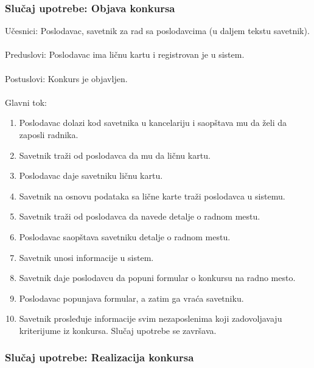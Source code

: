 \subsubsection{Slu\v caj upotrebe: Objava konkursa}
\label{su: razgovor sa poslodavcem}

\noindent Učesnici: Poslodavac, savetnik za rad sa poslodavcima (u daljem tekstu savetnik).
\\
\\ Preduslovi: Poslodavac ima ličnu kartu i registrovan je u sistem.
\\
\\ Postuslovi: Konkurs je objavljen.
\\
\\ Glavni tok:
\begin{enumerate}
\item Poslodavac dolazi kod savetnika u kancelariju i saopštava mu da želi da zaposli radnika.
\item Savetnik traži od poslodavca da mu da ličnu kartu.
\item Poslodavac daje savetniku ličnu kartu.
\item Savetnik na osnovu podataka sa lične karte traži poslodavca u sistemu.
\item Savetnik traži od poslodavca da navede detalje o radnom mestu.
\item Poslodavac saopštava savetniku detalje o radnom mestu.
\item Savetnik unosi informacije u sistem.
\item Savetnik daje poslodavcu da popuni formular o konkursu na radno mesto.
\item Poslodavac popunjava formular, a zatim ga vraća savetniku.
\item Savetnik prosleđuje informacije svim nezaposlenima koji zadovoljavaju kriterijume iz konkursa. Slučaj upotrebe se završava.
\end{enumerate}

\subsubsection{Slu\v caj upotrebe: Realizacija konkursa}

